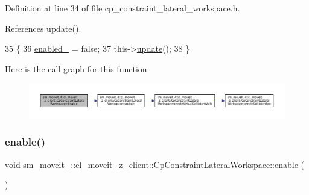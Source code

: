 Definition at line 34 of file cp\+\_\+constraint\+\_\+lateral\+\_\+workspace.\+h.



References update().


\begin{DoxyCode}
35             \{
36                 \hyperlink{classsm__moveit__4_1_1cl__moveit__z__client_1_1CpConstraintLateralWorkspace_a869220e440aadc79cf5213b6d27c1217}{enabled\_} = \textcolor{keyword}{false};
37                 this->\hyperlink{classsm__moveit__4_1_1cl__moveit__z__client_1_1CpConstraintLateralWorkspace_a83138028b5fab59b84b9170c5df24a54}{update}();
38             \}
\end{DoxyCode}
Here is the call graph for this function\+:
\nopagebreak
\begin{figure}[H]
\begin{center}
\leavevmode
\includegraphics[width=350pt]{classsm__moveit__4_1_1cl__moveit__z__client_1_1CpConstraintLateralWorkspace_a8d4567487c11e835447cc98d3046a9e2_cgraph}
\end{center}
\end{figure}
\mbox{\label{classsm__moveit__4_1_1cl__moveit__z__client_1_1CpConstraintLateralWorkspace_afa4487214f0213724159264de374267b}} 
\subsubsection{\texorpdfstring{enable()}{enable()}}
{\footnotesize\ttfamily void sm\+\_\+moveit\+\_\+::cl\+\_\+moveit\+\_\+z\+\_\+client\+::\+Cp\+Constraint\+Lateral\+Workspace\+::enable (\begin{DoxyParamCaption}{ }\end{DoxyParamCaption})\hspace{0.3cm}{\ttfamily [inline]}}



